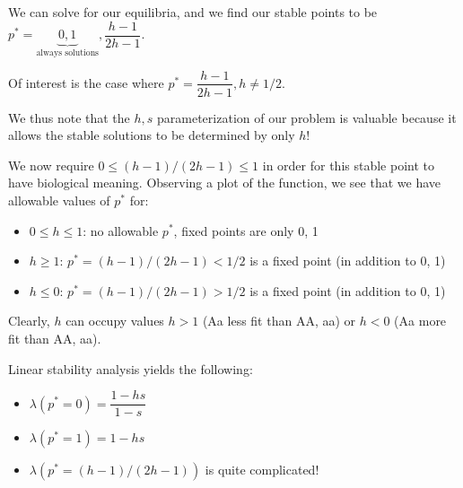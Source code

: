 \documentclass[11pt]{article}
\providecommand{\tightlist}{%
      \setlength{\itemsep}{0pt}\setlength{\parskip}{0pt}}
\begin{document}
We can solve for our equilibria, and we find our stable points to be
\(p^* = \underbrace{0, 1}_{\text{always solutions}} , \dfrac{h-1}{2h-1}\).

Of interest is the case where \(p^* = \dfrac{h-1}{2h-1}, h \ne 1/2\).

We thus note that the \(h, s\) parameterization of our problem is
valuable because it allows the stable solutions to be determined by only
\(h\)!

We now require \(0 \le (h-1)/(2h-1) \le 1\) in order for this stable
point to have biological meaning. Observing a plot of the function, we
see that we have allowable values of \(p^*\) for:

\begin{itemize}
\tightlist
\item
  \(0 \le h \le 1\): no allowable \(p^*\), fixed points are only 0, 1
\item
  \(h \ge 1\): \(p^* = (h-1)/(2h-1) < 1/2\) is a fixed point (in
  addition to 0, 1)
\item
  \(h \le 0\): \(p^* = (h-1)/(2h-1) > 1/2\) is a fixed point (in
  addition to 0, 1)
\end{itemize}

Clearly, \(h\) can occupy values \(h > 1\) (Aa less fit than AA, aa) or
\(h < 0\) (Aa more fit than AA, aa).

Linear stability analysis yields the following:

\begin{itemize}
\tightlist
\item
  \(\lambda(p^* = 0) = \dfrac{1-hs}{1-s}\)
\item
  \(\lambda(p^* = 1) = 1-hs\)
\item
  \(\lambda(p^* = (h-1)/(2h-1))\) is quite complicated!
\end{itemize}
\end{document}
